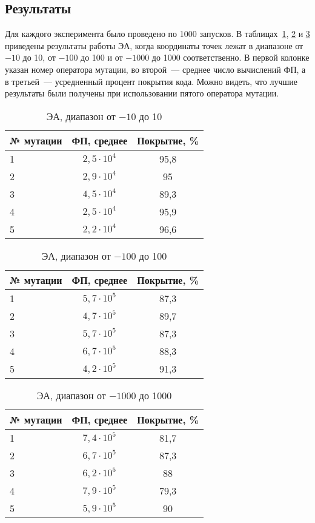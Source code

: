 \subsection{Результаты}

Для каждого эксперимента было проведено по 1000 запусков. В таблицах~\ref{huzita_10_res}, \ref{huzita_100_res} и \ref{huzita_1000_res} приведены результаты 
работы ЭА, когда координаты точек лежат в диапазоне от $-10$ до 10, от $-100$ до 100 и от $-1000$ до 1000 соответственно. В первой колонке указан номер 
оператора мутации, во второй~--- среднее число вычислений ФП, а в третьей~--- усредненный процент покрытия кода. Можно видеть, что лучшие результаты были 
получены при использовании пятого оператора мутации.

\begin{table}[h!]
\caption{ЭА, диапазон от $-10$ до 10} \label{huzita_10_res}
\begin{tabular}{|p{5em}|c|c|}
\hline
№ мутации &  ФП, среднее & Покрытие, \% \\\hline
1  & $2,5 \cdot 10^4$ &  95,8 \\\hline
2  & $2,9 \cdot 10^4$  &  95  \\\hline
3  & $4,5 \cdot 10^4$  &  89,3 \\\hline
4  & $2,5 \cdot 10^4$  &  95,9 \\\hline
5  & $2,2 \cdot 10^4$  &   \cellcolor{purpur}96,6 \\\hline
\end{tabular}
\end{table}

\begin{table}[h!]
\caption{ЭА, диапазон от $-100$ до 100} \label{huzita_100_res}
\begin{tabular}{|p{5em}|c|c|}
\hline
№ мутации &  ФП, среднее & Покрытие, \% \\\hline
1  & $5,7 \cdot 10^5$ & 87,3 \\\hline
2  & $4,7 \cdot 10^5$  &  89,7  \\\hline
3  & $5,7 \cdot 10^5$  &  87,3 \\\hline
4  & $6,7 \cdot 10^5$  &  88,3 \\\hline
5  & $4,2 \cdot 10^5$  &  \cellcolor{purpur}91,3 \\\hline
\end{tabular}
\end{table}

\begin{table}[h!]
\caption{ЭА, диапазон от $-1000$ до 1000} \label{huzita_1000_res}
\begin{tabular}{|p{5em}|c|c|}
\hline
№ мутации &  ФП, среднее & Покрытие, \% \\\hline
1  & $7,4 \cdot 10^5$  & 81,7 \\\hline
2  & $6,7 \cdot 10^5$  &  87,3  \\\hline
3  & $6,2 \cdot 10^5$ & 88 \\\hline
4  & $7,9 \cdot 10^5$  &  79,3 \\\hline
5  & $5,9 \cdot 10^5$ &  \cellcolor{purpur}90 \\\hline
\end{tabular}
\end{table}

